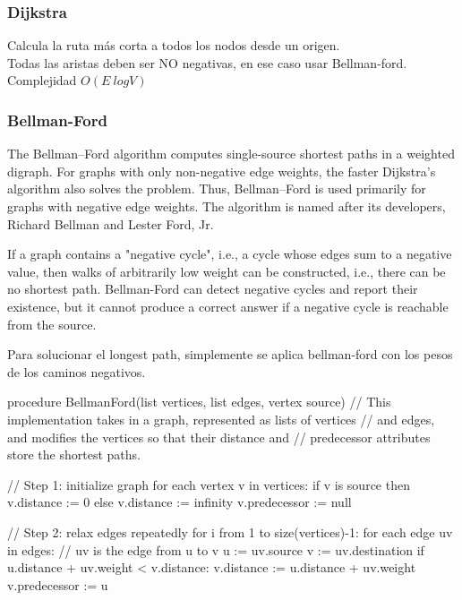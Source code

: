 \documentclass[10pt,letterpaper,twocolumn,twosided]{article}
\newcommand{\codigofuente}[1]{

\dotfill
}
\begin{document}
\subsubsection{Dijkstra}

Calcula la ruta más corta a todos los nodos desde un origen.\\
Todas las aristas deben ser NO negativas, en ese caso usar Bellman-ford.\\
Complejidad $O(E\ log V)$

\codigofuente{../src/dijkstra.${EXT}}


\subsubsection{Bellman-Ford}

The Bellman–Ford algorithm computes single-source shortest paths in a weighted digraph. For graphs with
only non-negative edge weights, the faster Dijkstra's algorithm also solves the problem. Thus, Bellman–Ford
is used primarily for graphs with negative edge weights. The algorithm is named after its developers, Richard
Bellman and Lester Ford, Jr.

If a graph contains a "negative cycle", i.e., a cycle whose edges sum to a negative value, then walks of
arbitrarily low weight can be constructed, i.e., there can be no shortest path. Bellman-Ford can detect
negative cycles and report their existence, but it cannot produce a correct answer if a negative cycle is
reachable from the source.

Para solucionar el longest path, simplemente se aplica bellman-ford con los pesos de los caminos negativos.

procedure BellmanFord(list vertices, list edges, vertex source)
   // This implementation takes in a graph, represented as lists of vertices
   // and edges, and modifies the vertices so that their distance and
   // predecessor attributes store the shortest paths.

   // Step 1: initialize graph
   for each vertex v in vertices:
       if v is source then v.distance := 0
       else v.distance := infinity
       v.predecessor := null

   // Step 2: relax edges repeatedly
   for i from 1 to size(vertices)-1:
       for each edge uv in edges: // uv is the edge from u to v
           u := uv.source
           v := uv.destination
           if u.distance + uv.weight < v.distance:
               v.distance := u.distance + uv.weight
               v.predecessor := u
\end{document}

